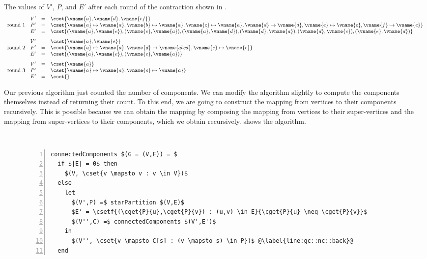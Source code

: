 {\begin{example}
The values of $V'$, $P$, and $E'$ after each round of the 
contraction shown in .
\[
\begin{array}{crcl}
  & V' & = & \cset{\vname{a},\vname{d},\vname{ef}}\\
\mbox{round } 1 & P' & = & 
 \cset{\vname{a} \mapsto \vname{a}, 
       \vname{b} \mapsto \vname{a}, 
       \vname{c} \mapsto \vname{a}, 
       \vname{d} \mapsto \vname{d}, 
       \vname{e} \mapsto \vname{e}, 
       \vname{f} \mapsto \vname{e}}\\
  & E' & = & \cset{(\vname{a},\vname{e}),
               (\vname{e},\vname{a}),
               (\vname{a},\vname{d}),
               (\vname{d},\vname{a}),
               (\vname{d},\vname{e}),
               (\vname{e},\vname{d})}\\[.1in]
  & V' & = & \cset{\vname{a},\vname{e}}\\
\mbox{round } 2 & P' & = & 
 \cset{\vname{a} \mapsto \vname{a}, 
       \vname{d} \mapsto \vname{abcd}, 
       \vname{e} \mapsto \vname{e}}\\
  & E' & = & \cset{(\vname{a},\vname{e}),
               (\vname{e},\vname{a})}\\[.1in]
  & V' & = & \cset{\vname{a}}\\
\mbox{round } 3 & P' & = & 
 \cset{\vname{a} \mapsto \vname{a}, 
       \vname{e} \mapsto \vname{a}}\\
  & E' & = & \cset{}
\end{array}
\]
\end{example}


Our previous algorithm just counted the number of components. 
%
We can modify the algorithm slightly to compute the components
themselves instead of returning their count. 
%
To this end, we are going to construct the mapping from vertices to
their components recursively. This is possible because we can obtain
the mapping by composing the mapping from vertices to their
super-vertices and the mapping from super-vertices to their
components, which we obtain recursively.  shows the
algorithm.

\begin{figure}
\begin{algorithm}
~
\label{alg:gc::nc}
\begin{lstlisting}[numbers=left]
connectedComponents $(G = (V,E)) = $
  if $|E| = 0$ then 
    $(V, \cset{v \mapsto v : v \in V})$
  else 
    let 
      $(V',P) =$ starPartition $(V,E)$
      $E' = \csetf{(\cget{P}{u},\cget{P}{v}) : (u,v) \in E}{\cget{P}{u} \neq \cget{P}{v}}$ 
      $(V'',C) =$ connectedComponents $(V',E')$
    in
      $(V'', \cset{v \mapsto C[s] : (v \mapsto s) \in P})$ @\label{line:gc::nc::back}@
  end
\end{lstlisting}
\end{algorithm}
\end{figure}

}
